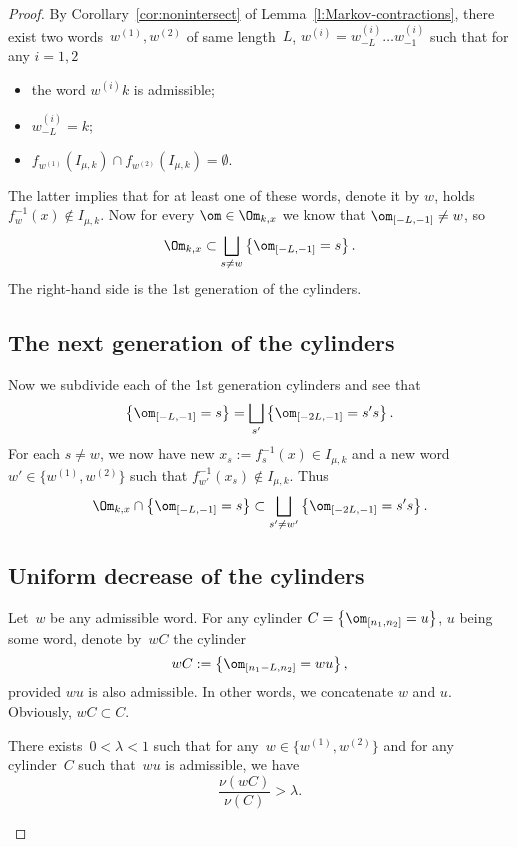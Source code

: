 \documentclass[a4paper,12pt]{amsart}
\begin{document}
\begin{proof}
By Corollary~\ref{cor:nonintersect} of Lemma~\ref{l:Markov-contractions}, there exist two words~$w^{(1)}, w^{(2)}$ of same length~$L$, $w^{(i)} = w^{(i)}_{-L} \dots w^{(i)}_{-1}$ such that for any $i=1, 2$
\begin{itemize}
  \item the word $w^{(i)} k$ is admissible;
  \item $w_{-L}^{(i)} = k$;
  \item $f_{w^{(1)}} (I_{\mu,k}) \cap f_{w^{(2)}} (I_{\mu,k}) = \emptyset$.
\end{itemize}
The latter implies that for at least one of these words, denote it by $w$, holds~$f_w^{-1} (x) \notin I_{\mu,k}$. Now for every $\om \in \Om_{k,x}$ we know that $\om_{[-L,-1]} \ne w$, so
$$
\Om_{k,x} \subset \bigsqcup_{s \ne w} \left\{ \om_{[-L,-1]} = s \right\}.
$$
The right-hand side is the 1st generation of the cylinders.

\subsection*{The next generation of the cylinders}

Now we subdivide each of the 1st generation cylinders and see that
$$
\left\{ \om_{[-L,-1]} = s \right\} = \bigsqcup_{s'} \left\{ \om_{[-2L,-1]} = s's \right\}.
$$
For each $s \ne w$, we now have new $x_s := f_s^{-1} (x) \in I_{\mu,k}$ and a new word $w' \in \{w^{(1)}, w^{(2)}\}$ such that $f_{w'}^{-1} (x_s) \notin I_{\mu,k}$.
Thus
\begin{equation}\label{e:next_cyl}
\Om_{k,x} \cap \left\{ \om_{[-L,-1]} = s \right\} \subset \bigsqcup_{s' \ne w'} \left\{ \om_{[-2L,-1]} = s's \right\}.
\end{equation}

\subsection*{Uniform decrease of the cylinders}

Let~$w$ be any admissible word. For any cylinder $C = \left\{ \om_{[n_1, n_2]} = u\right\}$, $u$ being some word, denote by~$wC$ the cylinder
$$
wC := \left\{ \om_{[n_1 - L, n_2]} = wu \right\},
$$
provided $wu$ is also admissible. In other words, we concatenate $w$ and $u$. Obviously, $wC \subset C$.

\begin{Prop}    \label{p:measure_property}
  There exists~$0 < \lambda < 1$ such that for any~$w \in \{ w^{(1)}, w^{(2)} \}$ and for any cylinder~$C$ such that~$wu$ is admissible, we have
  $$
  \frac{\nu(wC)}{\nu(C)} > \lambda.
  $$
\end{Prop}


\end{proof}
\end{document}
